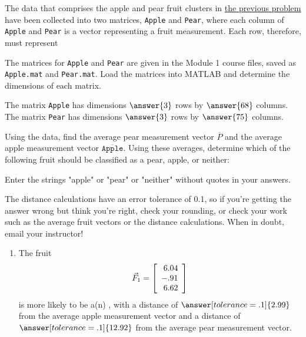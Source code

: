 \documentclass{ximera}
\author{Zack Reed}
\begin{document}
\begin{problem}

The data that comprises the apple and pear fruit clusters in \href{https://ximera.osu.edu/appliedlinearalgebra/c1ChapterOne/Exercises/c1Homework/apple_pear_vect}{the previous problem} have been collected into two matrices, \texttt{Apple} and \texttt{Pear}, where each column of \texttt{Apple} and \texttt{Pear} is a vector representing a fruit measurement. Each row, therefore, must represent

\begin{multipleChoice}
\end{multipleChoice}

The matrices for \texttt{Apple} and \texttt{Pear} are given in the Module 1 course files, saved as \texttt{Apple.mat} and \texttt{Pear.mat}. Load the matrices into MATLAB and determine the dimensions of each matrix.

The matrix \texttt{Apple} has dimensions $\answer{3}$ rows by $\answer{68}$ columns. The matrix \texttt{Pear} has dimensions $\answer{3}$ rows by $\answer{75}$ columns.

Using the data, find the average pear measurement vector $\overline{P}$ and the average apple measurement vector $\overline{\texttt{Apple}}$. Using these averages, determine which of the following fruit should be classified as a pear, apple, or neither:

\begin{hint}
  Enter the strings "apple" or "pear" or "neither" without quotes in your answers.
  
  The distance calculations have an error tolerance of 0.1, so if you're getting the answer wrong but think you're right, check your rounding, or check your work such as the average fruit vectors or the distance calculations. When in doubt, email your instructor!
\end{hint}

\begin{enumerate}
\item
The fruit
\begin{equation*}
  \vec{F}_1=\startmat{r}
    6.04 \\
    -.91 \\
    6.62
  \stopmat
\end{equation*}
is more likely to be a(n) , with a distance of $\answer[tolerance=.1]{2.99}$ from the average apple measurement vector and a distance of $\answer[tolerance=.1]{12.92}$ from the average pear measurement vector.


\end{enumerate}
\end{problem}
\end{document}
